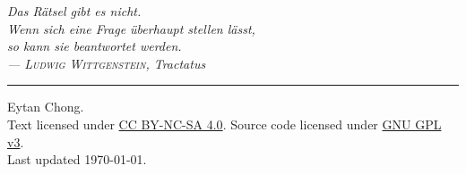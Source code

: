 \begin{titlepage}
    \vspace*{\fill}

    \begin{flushright}
		\large\itshape
        Das R\"{a}tsel gibt es nicht.\\[0.4cm]
        Wenn sich eine Frage \"{u}berhaupt stellen l\"{a}sst,\\[0.4cm]
        so kann sie beantwortet werden.\\[0.8cm]
		--- \textsc{Ludwig Wittgenstein}, \textit{Tractatus}
	\end{flushright}
    
    \vspace*{\fill}
    \hrule
    \medbreak
    {\small
    \noindent {\copyright} {\the\year} Eytan Chong.\\
    \noindent Text licensed under \href{https://creativecommons.org/licenses/by-nc-sa/4.0/}{CC BY-NC-SA 4.0}. Source code licensed under \href{https://www.gnu.org/licenses/gpl-3.0-standalone.html}{GNU GPL v3}.\\[0.4cm]
    \noindent Last updated \today.
    }
\end{titlepage}
